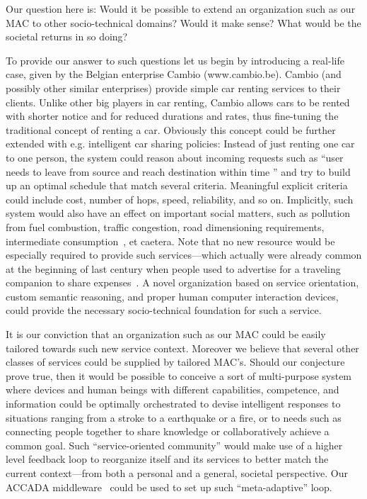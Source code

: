 \documentclass{llncs}
\begin{document}
Our question here is: Would it be possible to extend an organization such as our MAC to other
socio-technical domains? Would it make sense? What would be the societal returns in so doing?

To provide our answer to such questions let us begin by introducing a real-life case, given by the
Belgian enterprise Cambio (www.cambio.be). Cambio (and possibly other similar enterprises) provide simple
car renting services to their clients. Unlike other big players in car renting, Cambio allows cars to be
rented with shorter notice and for reduced durations and rates, thus fine-tuning the traditional concept
of renting a car. Obviously this concept could be further extended with e.g. intelligent car sharing
policies: Instead of just renting one car to one person, the system could reason about incoming requests
such as ``user  needs to leave from source  and reach destination  within time '' and try to
build up an optimal schedule that match several criteria. Meaningful explicit criteria could include
cost, number of hops, speed, reliability, and so on. Implicitly, such system would also have an effect on
important social matters, such as pollution from fuel combustion, traffic congestion, road dimensioning
requirements, intermediate consumption~\cite{ic}, et caetera. Note that no new resource would be
especially required to provide such services---which actually were already common at the beginning of last
century when people used to advertise for a traveling companion to share expenses~\cite{GBB}. A novel
organization based on service orientation, custom semantic reasoning, and proper human computer
interaction devices, could provide the necessary socio-technical foundation for such a service.

It is our conviction that an organization such as our MAC could be easily tailored towards such new
service context. Moreover we believe that several other classes of services could be supplied by tailored
MAC's. Should our conjecture prove true, then it would be possible to conceive a sort of multi-purpose
system where devices and human beings with different capabilities, competence, and information could be
optimally orchestrated to devise intelligent responses to situations ranging from a stroke to a
earthquake or a fire, or to needs such as connecting people together to share knowledge or
collaboratively achieve a common goal. Such ``service-oriented community''
would make use of a higher level feedback loop to reorganize itself and its services to
better match the current context---from both a personal and a general, societal perspective. Our ACCADA
middleware~\cite{GuD10+} could be used to set up such ``meta-adaptive'' loop.
\end{document}
